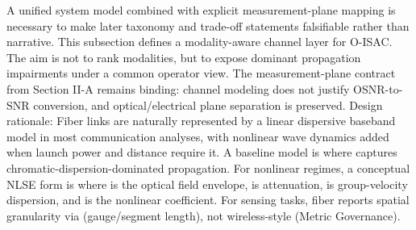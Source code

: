 {}\markdownRendererParagraphSeparator
{} A unified system model combined with explicit measurement-plane mapping is necessary to make later taxonomy and trade-off statements falsifiable rather than narrative.\markdownRendererInterblockSeparator
{}\markdownRendererThematicBreak{}\markdownRendererInterblockSeparator
{}
\markdownRendererSectionEnd 
\markdownRendererSectionEnd \markdownRendererSectionBegin
{}\markdownRendererInterblockSeparator
{}This subsection defines a modality-aware channel layer for O-ISAC. The aim is not to rank modalities, but to expose dominant propagation impairments under a common operator view. The measurement-plane contract from Section II-A remains binding: channel modeling does not justify OSNR-to-SNR conversion, and optical/electrical plane separation is preserved.\markdownRendererInterblockSeparator
{}\markdownRendererSectionBegin
{}\markdownRendererInterblockSeparator
{}Design rationale: Fiber links are naturally represented by a linear dispersive baseband model in most communication analyses, with nonlinear wave dynamics added when launch power and distance require it.\markdownRendererParagraphSeparator
{}A baseline model is\markdownRendererSoftLineBreak
{}\markdownRendererSoftLineBreak
{}where  captures chromatic-dispersion-dominated propagation.\markdownRendererParagraphSeparator
{}For nonlinear regimes, a conceptual NLSE form is\markdownRendererSoftLineBreak
{}\markdownRendererSoftLineBreak
{}where  is the optical field envelope, \markdownRendererInlineMath{\alpha} is attenuation,  is group-velocity dispersion, and \markdownRendererInlineMath{\gamma} is the nonlinear coefficient. For sensing tasks, fiber reports spatial granularity via  (gauge/segment length), not wireless-style  (Metric Governance).\markdownRendererParagraphSeparator
